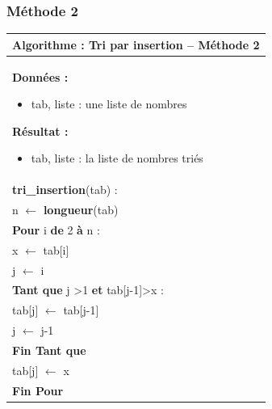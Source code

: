 \documentclass[10pt]{article}
\begin{document}
\subsubsection{Méthode 2}
\begin{minipage}[c]{.48\linewidth}
\begin{pseudo}
\begin{center}
\begin{tabular}{p{}}
\hline
\textbf{Algorithme :} Tri par insertion -- Méthode 2\\
\hline
\textbf{Données :}
\begin{itemize}
\item \textsf{tab}, liste : une liste de nombres
\end{itemize}
\textbf{Résultat :} 
\begin{itemize}
\item \textsf{tab}, liste : la liste de nombres triés
\end{itemize}
\\
\textbf{tri\_insertion}(\textsf{tab}) :\\
\hspace{.4cm} \textsf{n} $\leftarrow$ \textbf{longueur}(\textsf{tab}) \\
\hspace{.4cm}\textbf{Pour} \textsf{i} \textbf{de} 2 \textbf{à} \textsf{n} : \\
\hspace{.8cm} \textsf{x} $\leftarrow$ \textsf{tab[i]} \\
\hspace{.8cm} \textsf{j} $\leftarrow$ \textsf{i} \\
\hspace{.8cm}\textbf{Tant que} \textsf{j >1} \textbf{et} \textsf{tab[j-1]>x}  : \\
\hspace{1.2cm} \textsf{tab[j]} $\leftarrow$ \textsf{tab[j-1]} \\
\hspace{1.2cm} \textsf{j} $\leftarrow$ \textsf{j-1} \\
\hspace{.8cm}\textbf{Fin Tant que} \\
\hspace{.8cm} \textsf{tab[j]} $\leftarrow$ \textsf{x} \\
\hspace{.4cm}\textbf{Fin Pour} \\
\hline
\end{tabular}
\end{center}
\end{pseudo}
\end{minipage} \hfill
\end{document}
